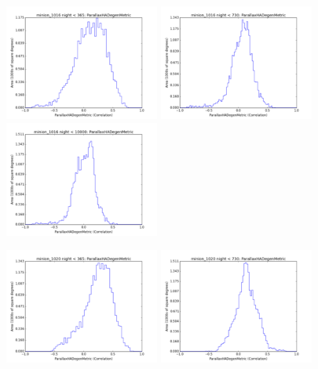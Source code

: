 \begin{figure}[ht]
  \begin{center}
  \includegraphics[width=2.0in]{./figs/milkyway/astromPanels/MW_Astrom_paDegen_Baseline_01y_hst.png}
  \includegraphics[width=2.0in]{./figs/milkyway/astromPanels/MW_Astrom_paDegen_Baseline_02y_hst.png}
  \includegraphics[width=2.0in]{./figs/milkyway/astromPanels/MW_Astrom_paDegen_Baseline_10y_hst.png}
  \end{center}
  \begin{center}
  \includegraphics[width=2.0in]{./figs/milkyway/astromPanels/MW_Astrom_paDegen_PanSTARRS_01y_hst.png}
  \includegraphics[width=2.0in]{./figs/milkyway/astromPanels/MW_Astrom_paDegen_PanSTARRS_02y_hst.png}

\end{center}
\end{figure}
